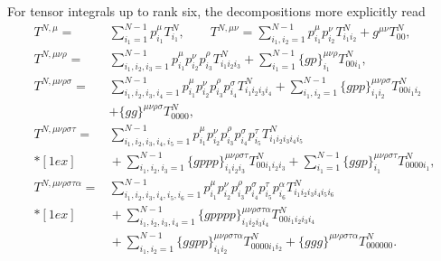 \documentclass[preprint,sort&compress,12pt]{elsarticle}
\def\al{\alpha}
\def\si{\sigma}
\newcommand{\ina}{i_1}
\newcommand{\inb}{i_2}
\newcommand{\inc}{i_3}
\newcommand{\ind}{i_4}
\newcommand{\ine}{i_5}
\newcommand{\ing}{i_6}
\def\nl{\nonumber\\}
\def\nls{\nonumber\\[1ex]}
\def\nlss{\nonumber\\*[1ex]}
\begin{document}
For tensor integrals up to rank six, the decompositions more explicitly read
\begin{align}
T^{N,\mu}=&\sum_{\ina=1}^{N-1} p_{\ina}^{\mu}T^N_{\ina}, \qquad
T^{N,\mu\nu}=\sum_{\ina,\inb=1}^{N-1} p_{\ina}^{\mu}p_{\inb}^{\nu}T^N_{\ina\inb}
+g^{\mu\nu}T^N_{00},\nls
T^{N,\mu\nu\rho}=&\sum_{\ina,\inb,\inc=1}^{N-1} p_{\ina}^{\mu}p_{\inb}^{\nu}p_{\inc}^{\rho}T^N_{\ina\inb\inc}
+\sum_{\ina=1}^{N-1}\{g p\}_{\ina}^{\mu\nu\rho} T^N_{00\ina}, 
\nls
T^{N,\mu\nu\rho\si} =& 
\sum_{\ina,\inb,\inc,\ind=1}^{N-1} p_{\ina}^{\mu}p_{\inb}^{\nu}p_{\inc}^{\rho}p_{\ind}^\si T^N_{\ina\inb\inc\ind}
+\sum_{\ina,\inb=1}^{N-1}
\{g pp\}_{\ina\inb}^{\mu\nu\rho\si}T^N_{00\ina\inb}
\nls&
+\{g g\}^{\mu\nu\rho\si} T^N_{0000},\nl
T^{N,\mu\nu\rho\si\tau} = &
\sum_{\ina,\inb,\inc,\ind,\ine=1}^{N-1}
p_{\ina}^{\mu}p_{\inb}^{\nu}p_{\inc}^{\rho}p_{\ind}^\si p_{\ine}^\tau T^N_{\ina
\inb\inc\ind\ine}
\nlss&{}
+\sum_{\ina,\inb,\inc=1}^{N-1}
\{g ppp\}_{\ina\inb\inc}^{\mu\nu\rho\si\tau}
T^N_{00\ina\inb\inc}
+\sum_{\ina=1}^{N-1} 
\{g g p\}_{\ina}^{\mu\nu\rho\si\tau} 
T^N_{0000\ina},\nls
T^{N,\mu\nu\rho\si\tau\al} =& 
\sum_{\ina,\inb,\inc,\ind,\ine,\ing=1}^{N-1}
p_{\ina}^{\mu}p_{\inb}^{\nu}p_{\inc}^{\rho}p_{\ind}^\si 
p_{\ine}^\tau p_{\ing}^\al T^N_{\ina\inb\inc\ind\ine\ing}
\nlss&{}
+\sum_{\ina,\inb,\inc,\ind=1}^{N-1}
\{g pppp\}_{\ina\inb\inc\ind}^{\mu\nu\rho\si\tau\al}
T^N_{00\ina\inb\inc\ind}
\nls&{}
+\sum_{\ina,\inb=1}^{N-1} 
\{g g pp\}_{\ina\inb}^{\mu\nu\rho\si\tau\al} 
T^N_{0000\ina\inb}
+ 
\{g g g\}^{\mu\nu\rho\si\tau\al} 
T^N_{000000}.
\end{align}
\end{document}
